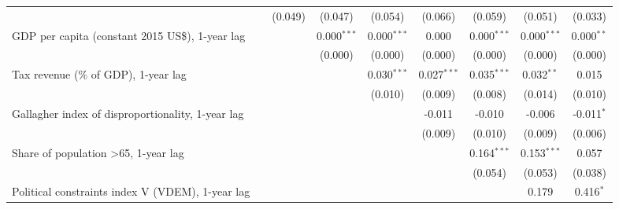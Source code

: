 \begin{table}[htbp]
\begin{tabular}{lcccccccc}
                                                                                                 &                & (0.049)      & (0.047)       & (0.054)       & (0.066)       & (0.059)       & (0.051)       & (0.033)\\   
      GDP per capita (constant 2015 US\$), 1-year lag                                            &                &              & 0.000$^{***}$ & 0.000$^{***}$ & 0.000         & 0.000$^{***}$ & 0.000$^{***}$ & 0.000$^{**}$\\   
                                                                                                 &                &              & (0.000)       & (0.000)       & (0.000)       & (0.000)       & (0.000)       & (0.000)\\   
      Tax revenue (\% of GDP), 1-year lag                                                        &                &              &               & 0.030$^{***}$ & 0.027$^{***}$ & 0.035$^{***}$ & 0.032$^{**}$  & 0.015\\   
                                                                                                 &                &              &               & (0.010)       & (0.009)       & (0.008)       & (0.014)       & (0.010)\\   
      Gallagher index of disproportionality, 1-year lag                                          &                &              &               &               & -0.011        & -0.010        & -0.006        & -0.011$^{*}$\\   
                                                                                                 &                &              &               &               & (0.009)       & (0.010)       & (0.009)       & (0.006)\\   
      Share of population >65, 1-year lag                                                        &                &              &               &               &               & 0.164$^{***}$ & 0.153$^{***}$ & 0.057\\   
                                                                                                 &                &              &               &               &               & (0.054)       & (0.053)       & (0.038)\\   
      Political constraints index V (VDEM), 1-year lag                                           &                &              &               &               &               &               & 0.179         & 0.416$^{*}$\\   

\end{tabular}
\end{table}
